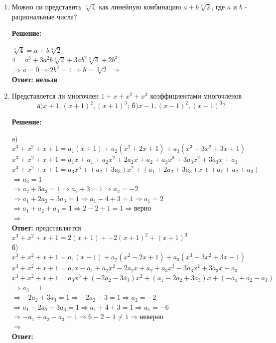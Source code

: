 \documentclass[]{book}
\theoremstyle{definition}
\begin{document}
\begin{enumerate}[resume]
\item Можно ли представить $\sqrt[3]{4}$ как линейную комбинацию $a+b\sqrt[3]{2}$, где $a$ и $b$ - рациональные числа?

\textbf{Решение:}

$\sqrt[3]{4} = a+b\sqrt[3]{2}$ \\
$4 = a^3+3a^2 b\sqrt[3]{2} + 3ab^2\sqrt[3]{4} +2b^3$\\
$\Longrightarrow a = 0  \Longrightarrow 2b^3 = 4 \Longrightarrow b = \sqrt[3]{2}$  $\Longrightarrow$ \\
\textbf{Ответ: нельзя}






\item Представлется ли многочлен $1+x+x^2+x^3$  коэффициентами многочленов
$$ \text{а)} x+1, (x+1)^2, (x+1)^3;\ \text{б)} x-1, (x-1)^2, (x-1)^3?$$

\textbf{Решение:}

а)$x^3+x^2+x+1 = a_1(x+1) + a_2(x^2+ 2x+1) + a_3(x^3+3x^2+3x+1)$\\
$x^3+x^2+x+1 = a_1 x+a_1 + a_2 x^2 + 2a_2 x+a_2 + a_3 x^3+3a_3 x^2+3a_3 x+a_3$\\
$x^3+x^2+x+1 = a_3 x^3+(a_2+3a_3)x^2+(a_1+2a_2+3a_3)x+(a_1+a_2+a_3)$\\
$\Longrightarrow a_3 = 1$\\
$\Longrightarrow a_2+3a_3 = 1 \Longrightarrow a_2 + 3 = 1\Longrightarrow a_2 = -2$\\
$\Longrightarrow a_1+2a_2+3a_3 = 1 \Longrightarrow a_1 -4 + 3 = 1\Longrightarrow a_1 = 2$\\
$\Longrightarrow a_1+a_2+a_3 = 1 \Longrightarrow 2-2+1 = 1\Longrightarrow \text{верно}$\\
$\Longrightarrow$  \\
\textbf{Ответ: } представляется $x^3+x^2+x+1 = 2(x+1) + -2(x+1)^2 + (x+1)^3$\\

б)$x^3+x^2+x+1 = a_1(x-1) + a_2(x^2- 2x+1) + a_3(x^3-3x^2+3x-1)$\\
$x^3+x^2+x+1 = a_1 x-a_1 + a_2 x^2 - 2a_2 x+a_2 + a_3 x^3-3a_3 x^2+3a_3 x-a_3$\\
$x^3+x^2+x+1 = a_3 x^3+(-2a_2-3a_3)x^2+(a_1-2a_2+3a_3)x+(-a_1+a_2-a_3)$\\
$\Longrightarrow a_3 = 1$\\
$\Longrightarrow -2a_2+3a_3 = 1 \Longrightarrow -2a_2 - 3 = 1\Longrightarrow a_2 = -2$\\
$\Longrightarrow a_1-2a_2+3a_3 = 1 \Longrightarrow a_1 +4 + 3 = 1\Longrightarrow a_1 = -6$\\
$\Longrightarrow -a_1+a_2-a_3 = 1 \Longrightarrow 6-2-1\neq 1\Longrightarrow \text{неверно}$\\
$\Longrightarrow$  \\
\textbf{Ответ: }


\end{enumerate}
\end{document}
